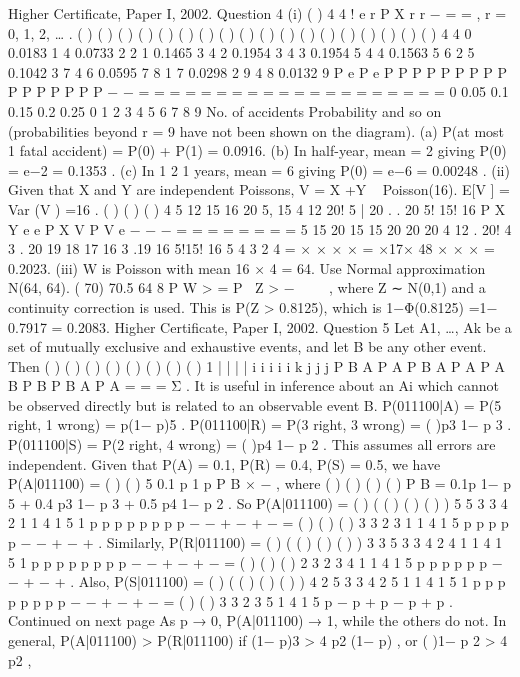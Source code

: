 \documentclass[a4paper,12pt]{article}
\begin{document}
Higher Certificate, Paper I, 2002. Question 4
(i) ( )
4 4
!
e r P X r
r
−
= = , r = 0, 1, 2, … .
( )
( )
( ) ( )
( ) ( )
( ) ( )
( ) ( )
( ) ( )
( ) ( )
( ) ( )
( ) ( )
4
4
0 0.0183
1 4 0.0733
2 2 1 0.1465
3 4 2 0.1954
3
4 3 0.1954
5 4 4 0.1563
5
6 2 5 0.1042
3
7 4 6 0.0595
7
8 1 7 0.0298
2
9 4 8 0.0132
9
P e
P e
P P
P P
P P
P P
P P
P P
P P
P P
−
−
= =
= =
= =
= =
= =
= =
= =
= =
= =
= =
0
0.05
0.1
0.15
0.2
0.25
0 1 2 3 4 5 6 7 8 9
No. of accidents
Probability
and so on (probabilities beyond r = 9 have not been shown on the diagram).
(a) P(at most 1 fatal accident) = P(0) + P(1) = 0.0916.
(b) In half-year, mean = 2 giving P(0) = e−2 = 0.1353 .
(c) In 1
2 1 years, mean = 6 giving P(0) = e−6 = 0.00248 .
(ii) Given that X and Y are independent Poissons, V = X +Y ~ Poisson(16).
E[V ] = Var (V ) =16 .
( ) ( )
( )
4 5 12 15
16 20
5, 15 4 12 20! 5 | 20 . .
20 5! 15! 16
P X Y e e P X V
P V e
− −
−
= =
= = = =
=
=
5 15 20 15 15
20 20 20
4 12 . 20! 4 3 . 20 19 18 17 16 3 .19
16 5!15! 16 5 4 3 2 4
= × × × × = ×17× 48
× × ×
= 0.2023.
(iii) W is Poisson with mean 16 × 4 = 64. Use Normal approximation N(64, 64).
( 70) 70.5 64
8
P W > = P Z > − 
 
, where Z ∼ N(0,1) and a continuity correction is
used. This is P(Z > 0.8125), which is 1−Φ(0.8125) =1− 0.7917 = 0.2083.
Higher Certificate, Paper I, 2002. Question 5
Let A1, …, Ak be a set of mutually exclusive and exhaustive events, and let B be any
other event.
Then ( ) ( ) ( )
( )
( ) ( )
( ) ( )
1
| |
|
|
i i i i
i k
j j
j
P B A P A P B A P A
P A B
P B P B A P A
=
= =
Σ
.
It is useful in inference about an Ai which cannot be observed directly but is related to
an observable event B.
P(011100|A) = P(5 right, 1 wrong) = p(1− p)5 .
P(011100|R) = P(3 right, 3 wrong) = ( )p3 1− p 3 .
P(011100|S) = P(2 right, 4 wrong) = ( )p4 1− p 2 .
This assumes all errors are independent.
Given that P(A) = 0.1, P(R) = 0.4, P(S) = 0.5, we have P(A|011100) = ( )
( )
5 0.1 p 1 p
P B
× −
,
where ( ) ( ) ( ) ( ) P B = 0.1p 1− p 5 + 0.4 p3 1− p 3 + 0.5 p4 1− p 2 .
So P(A|011100) = ( )
( ( ) ( ) ( ) )
5
5 3 3 4 2
1
1 4 1 5 1
p p
p p p p p p
−
− + − + −
= ( )
( ) ( )
3
3 2 3
1
1 4 1 5
p
p p p p
−
− + − +
.
Similarly, P(R|011100) = ( )
( ( ) ( ) ( ) )
3 3
5 3 3 4 2
4 1
1 4 1 5 1
p p
p p p p p p
−
− + − + −
= ( )
( ) ( )
2
3 2 3
4 1
1 4 1 5
p p
p p p p
−
− + − +
.
Also, P(S|011100) = ( )
( ( ) ( ) ( ) )
4 2
5 3 3 4 2
5 1
1 4 1 5 1
p p
p p p p p p
−
− + − + −
=
( ) ( )
3
3 2 3
5
1 4 1 5
p
− p + p − p + p
.
Continued on next page
As p → 0, P(A|011100) → 1, while the others do not.
In general, P(A|011100) > P(R|011100) if (1− p)3 > 4 p2 (1− p) , or ( )1− p 2 > 4 p2 ,
\end{document}
